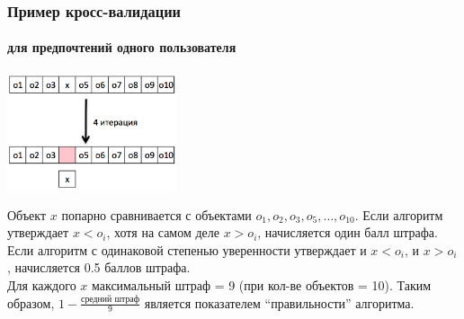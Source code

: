 \documentclass[xcolor=table,handout]{beamer}
\theoremstyle{definition}
\begin{document}
	\begin{frame}
		\frametitle{Пример кросс-валидации}
		\framesubtitle{для предпочтений одного пользователя}
		\begin{center}
			\includegraphics[width=50mm]{./images/cross-validation.png}
		\end{center}
		
		Объект $x$ попарно сравнивается с объектами $o_1, o_2, o_3, o_5, \dots, o_{10}$. Если алгоритм утверждает $x < o_i$, хотя на самом деле $x > o_i$, начисляется один балл штрафа. Если алгоритм с одинаковой степенью уверенности утверждает и $x < o_i$, и  $x > o_i$, начисляется 0.5 баллов штрафа.\\
		\vspace{0.5em}
		Для каждого $x$ максимальный штраф = 9 (при кол-ве объектов = 10). Таким образом, $1 - \frac{\text{средний~штраф}}{9}$ является показателем ``правильности'' алгоритма.
	\end{frame}
	
\end{document}
